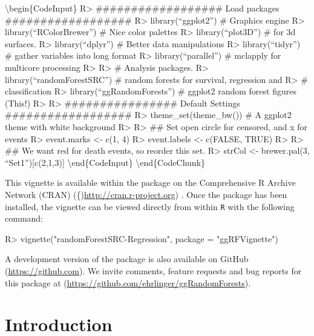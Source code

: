 \documentclass[article]{jss}
\begin{document}
\textbackslash{}begin\{CodeInput\} R\textgreater{}
\#\#\#\#\#\#\#\#\#\#\#\#\#\#\#\#\#\# Load packages
\#\#\#\#\#\#\#\#\#\#\#\#\#\#\#\#\#\# R\textgreater{}
library(``ggplot2'') \# Graphics engine R\textgreater{}
library(``RColorBrewer'') \# Nice color palettes R\textgreater{}
library(``plot3D'') \# for 3d surfaces. R\textgreater{}
library(``dplyr'') \# Better data manipulations R\textgreater{}
library(``tidyr'') \# gather variables into long format R\textgreater{}
library(``parallel'') \# mclapply for multicore processing
R\textgreater{} R\textgreater{} \# Analysis packages. R\textgreater{}
library(``randomForestSRC'') \# random forests for survival, regression
and R\textgreater{} \# classification R\textgreater{}
library(``ggRandomForests'') \# ggplot2 random forest figures (This!)
R\textgreater{} R\textgreater{} \#\#\#\#\#\#\#\#\#\#\#\#\#\#\#\# Default
Settings \#\#\#\#\#\#\#\#\#\#\#\#\#\#\#\#\#\# R\textgreater{}
theme\_set(theme\_bw()) \# A ggplot2 theme with white background
R\textgreater{} R\textgreater{} \#\# Set open circle for censored, and x
for events R\textgreater{} event.marks \textless{}- c(1, 4)
R\textgreater{} event.labels \textless{}- c(FALSE, TRUE) R\textgreater{}
R\textgreater{} \#\# We want red for death events, so reorder this set.
R\textgreater{} strCol \textless{}- brewer.pal(3,
``Set1''){[}c(2,1,3){]} \textbackslash{}end\{CodeInput\}
\textbackslash{}end\{CodeChunk\}

This vignette is available within the  package on
the Comprehensive R Archive Network (CRAN)
(\{)\url{http://cran.r-project.org}) \citep{rcore}. Once the package has
been installed, the vignette can be viewed directly from within
\texttt{R} with the following command:

\begin{CodeChunk}

\begin{CodeInput}
R> vignette("randomForestSRC-Regression", package = "ggRFVignette")
\end{CodeInput}
\end{CodeChunk}

A development version of the  package is also
available on GitHub (\url{https://github.com}). We invite comments,
feature requests and bug reports for this package at
(\url{https://github.com/ehrlinger/ggRandomForests}).

\hypertarget{introduction}{%
\section{Introduction}\label{introduction}}
\end{document}
